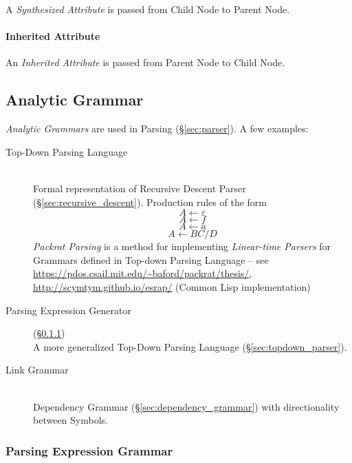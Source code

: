 A \emph{Synthesized Attribute} is passed from Child Node to Parent
Node.



\paragraph{Inherited Attribute}\label{sec:inherited_attribute}\hfill

An \emph{Inherited Attribute} is passed from Parent Node to Child
Node.



\subsection{Analytic Grammar}\label{sec:analytic_grammar}

\emph{Analytic Grammars} are used in Parsing (\S\ref{sec:parser}). A
few examples:

\begin{description}
\item[Top-Down Parsing Language] \hfill \\
  Formal representation of Recursive Descent Parser
  (\S\ref{sec:recursive_descent}). Production rules of the form
  \[
    A \leftarrow \varepsilon
  \]\[
    A \leftarrow f
  \]\[
    A \leftarrow a
  \]\[
    A \leftarrow BC/D
  \]
  \emph{Packrat Parsing} is a method for implementing \emph{Linear-time
    Parsers} for Grammars defined in Top-down Parsing Language -- \fist see
  \url{https://pdos.csail.mit.edu/~baford/packrat/thesis/},
  \url{http://scymtym.github.io/esrap/} (Common Lisp implementation)
\item[Parsing Expression Generator] (\S\ref{sec:parsing_expression_grammar})
  \hfill \\ A more generalized Top-Down Parsing Language
  (\S\ref{sec:topdown_parser}).
\item[Link Grammar] \hfill \\
  Dependency Grammar (\S\ref{sec:dependency_grammar}) with
  directionality between Symbols.
\end{description}



\subsubsection{Parsing Expression Grammar}\label{sec:parsing_expression_grammar}

